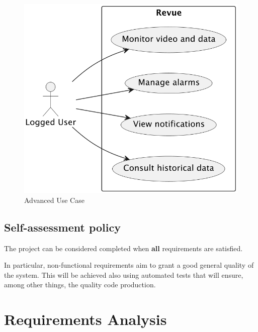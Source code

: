 \documentclass{scrartcl}
\begin{document}
    \begin{figure}[ht]
        \centering
        \includegraphics[scale=0.6]{img/advanced-use-case}
        \caption{Advanced Use Case}
        \label{fig:advanced-use-case}
    \end{figure}

    \subsection{Self-assessment policy}

    The project can be considered completed when \textbf{all} requirements are satisfied.

    In particular, non-functional requirements aim to grant a good general quality of the system. This will be achieved also using automated tests that will ensure, among other things, the quality code production.


    \section{Requirements Analysis}

%
%

%
\end{document}
